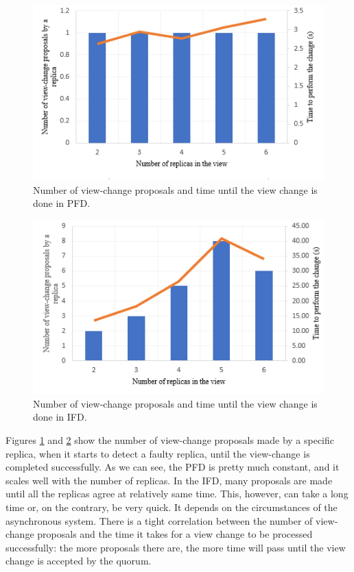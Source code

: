 \documentclass[times, 10pt,twocolumn]{article}
\begin{document}
\begin{figure}[h]
\centering
\includegraphics[width=1\linewidth]{images/pfd.png}
\caption{Number of view-change proposals and time until the view change is done in PFD.}
\label{fig:pfd}
\end{figure}

\begin{figure}[h]
\centering
\includegraphics[width=1\linewidth]{images/ifd.png}
\caption{Number of view-change proposals and time until the view change is done in IFD.}
\label{fig:ifd}
\end{figure}

Figures \ref{fig:pfd} and \ref{fig:ifd} show the number of view-change proposals made
by a specific replica, when it starts to detect a faulty replica, until the view-change is completed successfully. As we can see, the PFD is pretty much constant, and it scales well with the number of replicas.
In the IFD, many proposals are made until all the replicas agree at relatively same time. This, however, can take a long
time or, on the contrary, be very quick. It depends on the circumstances of the asynchronous system. There is a tight correlation between the number of view-change proposals and the time it takes for a view change to be processed successfully:
the more proposals there are, the more time will pass until the view change is accepted by the quorum.
\end{document}
